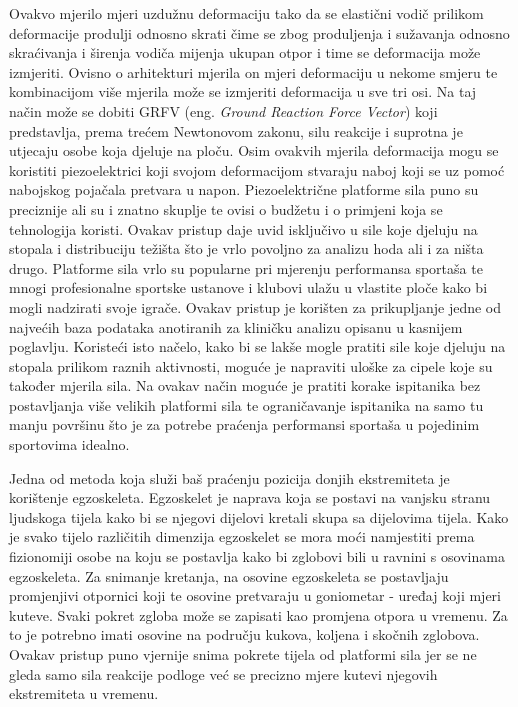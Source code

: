 \documentclass[times, utf8, diplomski]{fer}
\begin{document}
Ovakvo mjerilo mjeri uzdužnu deformaciju tako da se elastični vodič prilikom deformacije produlji odnosno skrati
čime se zbog produljenja i sužavanja odnosno skraćivanja i širenja vodiča mijenja ukupan otpor i time se deformacija može izmjeriti.
Ovisno o arhitekturi mjerila on mjeri deformaciju u nekome smjeru te kombinacijom više mjerila može se izmjeriti deformacija
u sve tri osi. Na taj način može se dobiti GRFV (eng. \textit{Ground Reaction Force Vector}) koji predstavlja, prema trećem Newtonovom zakonu,
silu reakcije i suprotna je utjecaju osobe koja djeluje na ploču. Osim ovakvih mjerila deformacija mogu se koristiti piezoelektrici
koji svojom deformacijom stvaraju naboj koji se uz pomoć nabojskog pojačala pretvara u napon. Piezoelektrične platforme sila puno su preciznije ali su
i znatno skuplje te ovisi o budžetu i o primjeni koja se tehnologija koristi. Ovakav pristup daje uvid isključivo u sile koje
djeluju na stopala i distribuciju težišta što je vrlo povoljno za analizu hoda ali i za ništa drugo. Platforme sila vrlo su popularne
pri mjerenju performansa sportaša te mnogi profesionalne sportske ustanove i klubovi ulažu u vlastite ploče kako bi mogli nadzirati
svoje igrače. Ovakav pristup je korišten za prikupljanje jedne od najvećih baza podataka anotiranih za kliničku analizu \citep{pressurePlate}
opisanu u kasnijem poglavlju. Koristeći isto načelo, kako bi se lakše mogle pratiti sile koje djeluju na stopala prilikom
raznih aktivnosti, moguće je napraviti uloške za cipele koje su također mjerila sila. Na ovakav način moguće je pratiti korake
ispitanika bez postavljanja više velikih platformi sila te ograničavanje ispitanika na samo tu manju površinu što je za potrebe
praćenja performansi sportaša u pojedinim sportovima idealno.

Jedna od metoda koja služi baš praćenju pozicija donjih ekstremiteta je korištenje egzoskeleta. Egzoskelet je naprava koja se
postavi na vanjsku stranu ljudskoga tijela kako bi se njegovi dijelovi kretali skupa sa dijelovima tijela. Kako je svako tijelo
različitih dimenzija egzoskelet se mora moći namjestiti prema fizionomiji osobe na koju se postavlja kako bi zglobovi bili u
ravnini s osovinama egzoskeleta. Za snimanje kretanja, na osovine egzoskeleta se postavljaju promjenjivi otpornici koji te osovine
pretvaraju u goniometar - uređaj koji mjeri kuteve. Svaki pokret zgloba može se zapisati kao promjena otpora u vremenu. Za to je
potrebno imati osovine na području kukova, koljena i skočnih zglobova. Ovakav pristup puno vjernije snima pokrete tijela od platformi sila
jer se ne gleda samo sila reakcije podloge već se precizno mjere kutevi njegovih ekstremiteta u vremenu. 
\end{document}
